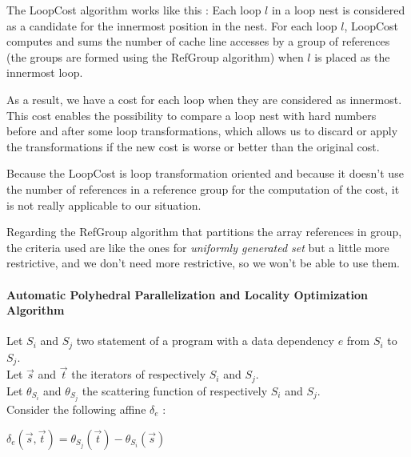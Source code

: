\documentclass[paper=a4, fontsize=11.5pt]{scrartcl}
\numberwithin{equation}{section}        %
\numberwithin{figure}{section}          %
\numberwithin{table}{section}               %
\begin{document}
            The LoopCost algorithm works like this : 
            Each loop $l$ in a loop nest is considered as a candidate for the innermost
            position in the nest. For each loop $l$, LoopCost computes and sums the number
            of cache line accesses by a group of references (the groups are formed
            using the RefGroup algorithm) when $l$ is placed as the innermost loop.

            As a result, we have a cost for each loop when they are considered as innermost.
            This cost enables the possibility to compare a loop nest with hard numbers 
            before and after some loop transformations, which allows us to discard
            or apply the transformations if the new cost is worse or better than the
            original cost.
            \bigskip

            Because the LoopCost is loop transformation oriented and because it doesn't
            use the number of references in a reference group for the computation
            of the cost, it is not really applicable to our situation.

            Regarding the RefGroup algorithm that partitions the array references
            in group, the criteria used are like the ones for \textit{uniformly generated set}
            but a little more restrictive, and we don't need more restrictive, so we won't
            be able to use them.
            
            
        \paragraph{Automatic Polyhedral Parallelization and Locality Optimization Algorithm}
        \label{sec:auto_poly_paral}
            Let $S_i$ and $S_j$ two statement of a program with a data dependency $e$
            from $S_i$ to $S_j$.\\
            Let $\vec{s}$ and $\vec{t}$ the iterators of respectively $S_i$ and $S_j$.\\
            Let $\theta_{S_i}$ and $\theta_{S_j}$ the scattering function of respectively $S_i$
            and $S_j$.\\
            Consider the following affine $\delta_e$ :
            \begin{center}
                $\delta_e\left(\vec{s},\vec{t}\right) = \theta_{S_j}\left(\vec{t}\right) - \theta_{S_i}\left(\vec{s}\right)$
            \end{center}
\end{document}
